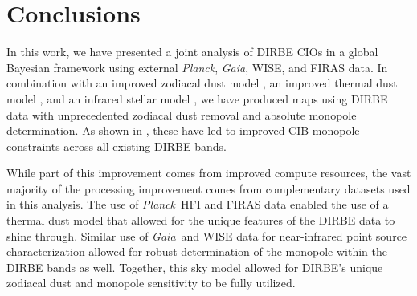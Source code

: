 \documentclass{aa}
\def\Cosmoglobe{\textsc{Cosmoglobe}}
\def\Planck{\textit{Planck}}
\def\Gaia{\textit{Gaia}}
\begin{document}
%       
%       
%       
%       
%       
%       
%       


\section{Conclusions}
\label{sec:conclusions}

In this work, we have presented a joint analysis of DIRBE CIOs in a global Bayesian framework using external \Planck, \Gaia, WISE, and FIRAS data. In combination with an improved zodiacal dust model \citep{CG02_02}, an improved thermal dust model \citep{CG02_05}, and an infrared stellar model \citep{CG02_04}, we have produced maps using DIRBE data with unprecedented zodiacal dust removal and absolute monopole determination. As shown in \citet{CG02_03}, these have led to improved CIB monopole constraints across all existing DIRBE bands.

While part of this improvement comes from improved compute resources, the vast majority of the processing improvement comes from complementary datasets used in this analysis. The use of \Planck\ HFI and FIRAS data enabled the use of a thermal dust model that allowed for the unique features of the DIRBE data to shine through. Similar use of \Gaia\ and WISE data for near-infrared point source characterization allowed for robust determination of the monopole within the DIRBE bands as well. Together, this sky model allowed for DIRBE's unique zodiacal dust and monopole sensitivity to be fully utilized.
\end{document}
